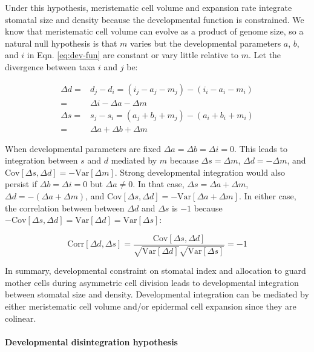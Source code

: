 \documentclass[
  12pt,
]{article}
\begin{document}
Under this hypothesis, meristematic cell volume and expansion rate integrate stomatal size and density because the developmental function is constrained. We know that meristematic cell volume can evolve as a product of genome size, so a natural null hypothesis is that \(m\) varies but the developmental parameters \(a\), \(b\), and \(i\) in Eqn. \ref{eq:dev-fun} are constant or vary little relative to \(m\). Let the divergence between taxa \(i\) and \(j\) be:

\begin{align}
  \Delta d = & d_j - d_i = (i_j - a_j - m_j) - (i_i - a_i - m_i) \\
    = & \Delta i - \Delta a - \Delta m \\
  \Delta s = & s_j - s_i = (a_j + b_j + m_j) - (a_i + b_i + m_i) \\
    = & \Delta a + \Delta b + \Delta m 
\end{align}

When developmental parameters are fixed \(\Delta a = \Delta b = \Delta i = 0\). This leads to integration between \(s\) and \(d\) mediated by \(m\) because \(\Delta s = \Delta m\), \(\Delta d = -\Delta m\), and \(\textrm{Cov}[\Delta s, \Delta d] = -\textrm{Var}[\Delta m]\). Strong developmental integration would also persist if \(\Delta b = \Delta i = 0\) but \(\Delta a \ne 0\). In that case, \(\Delta s = \Delta a + \Delta m\), \(\Delta d = -(\Delta a + \Delta m)\), and \(\textrm{Cov}[\Delta s, \Delta d] = -\textrm{Var}[\Delta a + \Delta m]\). In either case, the correlation between between \(\Delta d\) and \(\Delta s\) is \(-1\) because \(-\textrm{Cov}[\Delta s, \Delta d] = \textrm{Var}[\Delta d] = \textrm{Var}[\Delta s]\):

\begin{equation}
  \textrm{Corr}[\Delta d, \Delta s] = \frac{\textrm{Cov}[\Delta s, \Delta d]}{\sqrt{\textrm{Var}[\Delta d]} \sqrt{\textrm{Var}[\Delta s]}} = -1
\end{equation}

In summary, developmental constraint on stomatal index and allocation to guard mother cells during asymmetric cell division leads to developmental integration between stomatal size and density. Developmental integration can be mediated by either meristematic cell volume and/or epidermal cell expansion since they are colinear.

\hypertarget{developmental-disintegration-hypothesis}{%
\paragraph{Developmental disintegration hypothesis}\label{developmental-disintegration-hypothesis}}
\end{document}
